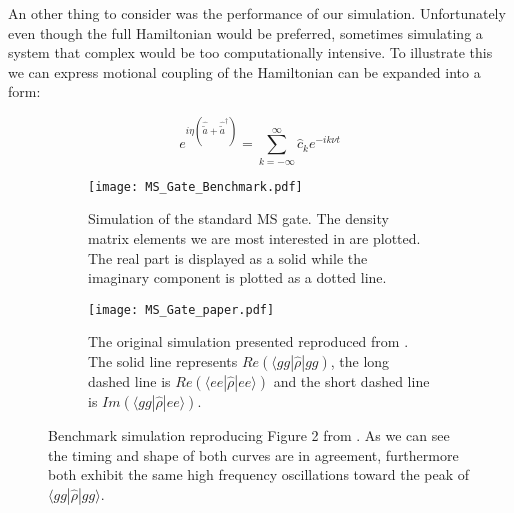 \documentclass[12pt,twoside]{report}
\begin{document}
An other thing to consider was the performance of our simulation. Unfortunately even though the full Hamiltonian would be preferred, sometimes simulating a system that complex would be too computationally intensive. To illustrate this we can express motional coupling of the Hamiltonian can be expanded into a form:

\begin{equation}
	e^{i\eta\left(\hat{\tilde{a}}+\hat{\tilde{a}}^\dagger\right)} = \sum_{k=-\infty}^\infty \hat{c}_k e^{-ik\nu t}
	\label{eq:Mot_exp}
\end{equation}

\begin{figure}[t!]
	\centering
	\begin{subfigure}[t]{0.475\textwidth}
		\centering
		\texttt{[image: MS\_Gate\_Benchmark.pdf]}
		\caption{Simulation of the standard MS gate. The density matrix elements we are most interested in are plotted. The real part is displayed as a solid while the imaginary component is plotted as a dotted line.}
		\label{fig:msbench:measured}
	\end{subfigure}
	\hfill
	\begin{subfigure}[t]{0.475\textwidth}
		\centering
		\texttt{[image: MS\_Gate\_paper.pdf]}
		\caption{The original simulation presented reproduced from \cite{MS_gate}. The solid line represents $Re\left(\langle gg|\hat{\rho}| gg\right)$, the long dashed line is $Re\left(\langle ee|\hat{\rho}|ee\rangle\right)$ and the short dashed line is $Im\left(\langle gg|\hat{\rho}|ee\rangle\right)$.}
		\label{fig:msbench:original}
	\end{subfigure}
	\caption[MS Gate benchmark]{Benchmark simulation reproducing Figure 2 from \cite{MS_gate}. As we can see the timing and shape of both curves are in agreement, furthermore both exhibit the same high frequency oscillations toward the peak of $\langle gg|\hat{\rho}|gg\rangle$.}
	\label{fig:msbench}
\end{figure}
\end{document}
